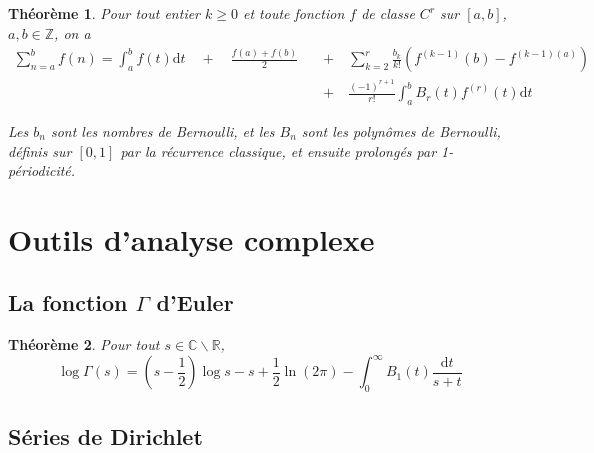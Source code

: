 \documentclass[french]{report}
\newtheorem{theorem}{Théorème}[section]
\begin{document}
\begin{theorem}\label{eq:euler-maclaurin}
  Pour tout entier $k\geq0$ et toute fonction $f$ de classe $C^r$ sur $[a,b]$, $a,b\in\mathbb{Z}$, on a
  \begin{align*}
    \sum_{n=a}^b f(n) = \int_a^b f(t)\mathrm{d}t \quad + \quad \frac{f(a) + f(b)}{2} \quad &+ \quad \sum_{k=2}^r\frac{b_{k}}{k!}(f^{(k-1)}(b) - f^{(k-1)(a)}) \\
    &+ \quad \frac{(-1)^{r+1}}{r!}\int_a^b B_r(t)f^{(r)}(t)\mathrm{d}t
  \end{align*}

  Les $b_n$ sont les nombres de Bernoulli, et les $B_n$ sont les polynômes de Bernoulli, définis sur $[0,1]$ par la récurrence classique, et ensuite prolongés par 1-périodicité.
\end{theorem}

\section{Outils d'analyse complexe}

\subsection{La fonction $\Gamma$ d'Euler}

\begin{theorem}\label{thm:stirling-complexe}
  Pour tout $s\in\mathbb{C}\backslash\mathbb{R}$,
  \[
    \log\Gamma(s)
    = (s-\frac{1}{2})\log s
    - s
    + \frac{1}{2}\ln(2\pi)
    - \int_0^\infty B_1(t)\frac{\mathrm{d}t}{s+t}
  \]
\end{theorem}

\subsection{Séries de Dirichlet}
\end{document}

